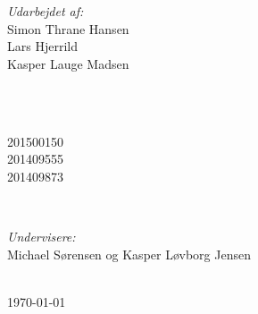 \begin{titlepage}
		\begin{minipage}{0.4\textwidth}
			\begin{flushleft} \large
				\emph{Udarbejdet af:}\\
				Simon Thrane Hansen \\%
				Lars Hjerrild \\%
				Kasper Lauge Madsen
			\end{flushleft}
		\end{minipage}
		~
		\begin{minipage}{0.4\textwidth}
			\begin{flushright} \large
				\ \\
				201500150 \\%
				201409555\\ 	
				201409873 
			\end{flushright}
		\end{minipage}\\[0.5cm]
		
		
		\begin{minipage}{0.3\textwidth}
			\begin{center} \large
				\emph{Undervisere:} \\
				Michael Sørensen og Kasper Løvborg Jensen
			\end{center}
		\end{minipage}\\[0.5cm]
	
		
		
		{\large \today}\\[2cm] %
		
	
		
\end{titlepage}
